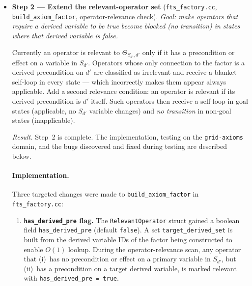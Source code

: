 \documentclass[11pt,a4paper]{article}
\begin{document}
\begin{itemize}
    \medskip
    \noindent\textit{Recommended starting points for Phase~2 testing:}
    \texttt{grid-axioms} and \texttt{miconic-axioms} (single clean \texttt{reachable}
    predicate, no conditional effects); \texttt{ged1-ds1} (single \texttt{not-between}
    predicate, with conditional effects).  \texttt{psr-middle}/\texttt{psr-large}
    are the most realistic but also the most complex (conditional effects
    conditioned on the same derived variable \texttt{affected}).

  \item \textbf{Step 2 — Extend the relevant-operator set}
    (\texttt{fts\_factory.cc}, \texttt{build\_axiom\_factor}, operator-relevance
    check).
    \emph{Goal: make operators that require a derived variable to be true become
    blocked (no transition) in states where that derived variable is false.}

    Currently an operator is relevant to $\Theta_{S_{d'},d'}$ only if it has a
    precondition or effect on a variable in $S_{d'}$.  Operators whose only
    connection to the factor is a derived precondition on $d'$ are classified as
    irrelevant and receive a blanket self-loop in every state --- which
    incorrectly makes them appear always applicable.  Add a second relevance
    condition: an operator is relevant if its derived precondition is $d'$
    itself.  Such operators then receive a self-loop in goal states (applicable,
    no $S_{d'}$ variable changes) and \emph{no transition} in non-goal states
    (inapplicable).

    \medskip
    \noindent\textit{Result.}
    Step~2 is complete.  The implementation, testing on the \texttt{grid-axioms}
    domain, and the bugs discovered and fixed during testing are described below.

    \paragraph{Implementation.}
    Three targeted changes were made to \texttt{build\_axiom\_factor} in
    \texttt{fts\_factory.cc}:

    \begin{enumerate}
      \item \textbf{\texttt{has\_derived\_pre} flag.}
        The \texttt{RelevantOperator} struct gained a boolean field
        \texttt{has\_derived\_pre} (default \texttt{false}).  A set
        \texttt{target\_derived\_set} is built from the derived variable IDs
        of the factor being constructed to enable $O(1)$ lookup.  During the
        operator-relevance scan, any operator that (i)~has no precondition or
        effect on a primary variable in $S_{d'}$, but (ii)~has a precondition
        on a target derived variable, is marked relevant with
        \texttt{has\_derived\_pre = true}.


\end{enumerate}
\end{itemize}
\end{document}
